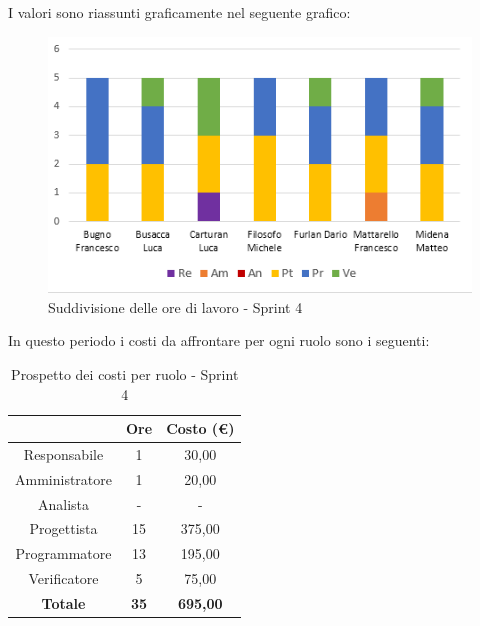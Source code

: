 I valori sono riassunti graficamente nel seguente grafico:

\begin{figure}[H]
  \centering
  \includegraphics[scale=1.0]{immagini/4Sprint_oreLavoro.png}
  \caption{Suddivisione delle ore di lavoro - Sprint 4}
\end{figure}

\pagebreak
In questo periodo i costi da affrontare per ogni ruolo sono i seguenti:

\begin{table}[H]
  \centering
  \renewcommand{\arraystretch}{1.8}
  \begin{tabular}{c|c|c}
    \rowcolor[HTML]{125E28}
    \multicolumn{1}{c}{\color[HTML]{FFFFFF}\textbf{Ruolo}}
                    & \multicolumn{1}{c}{\color[HTML]{FFFFFF}\textbf{Ore}}
                    & \multicolumn{1}{c}{\color[HTML]{FFFFFF}\textbf{Costo (€)}}                   \\
    \hline
    Responsabile    & 1                                                          & 30,00           \\
    Amministratore  & 1                                                          & 20,00           \\
    Analista        & -                                                          & -               \\
    Progettista     & 15                                                         & 375,00          \\
    Programmatore   & 13                                                         & 195,00          \\
    Verificatore    & 5                                                          & 75,00           \\
    \textbf{Totale} & \textbf{35}                                                & \textbf{695,00}
  \end{tabular}
  \caption{Prospetto dei costi per ruolo - Sprint 4}
\end{table}


